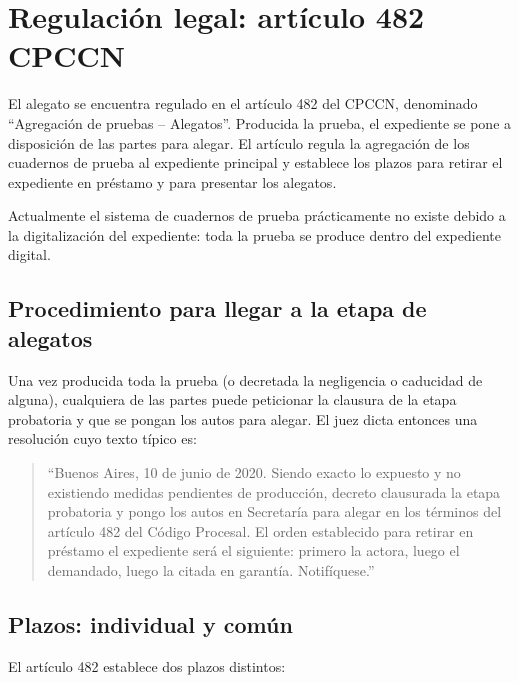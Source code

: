 \documentclass[12pt,oneside]{book}
\begin{document}
\section{Regulación legal: artículo 482 CPCCN}

El alegato se encuentra regulado en el artículo 482 del CPCCN, denominado ``Agregación de pruebas -- Alegatos''. Producida la prueba, el expediente se pone a disposición de las partes para alegar. El artículo regula la agregación de los cuadernos de prueba al expediente principal y establece los plazos para retirar el expediente en préstamo y para presentar los alegatos.

Actualmente el sistema de cuadernos de prueba prácticamente no existe debido a la digitalización del expediente: toda la prueba se produce dentro del expediente digital.

\subsection{Procedimiento para llegar a la etapa de alegatos}

Una vez producida toda la prueba (o decretada la negligencia o caducidad de alguna), cualquiera de las partes puede peticionar la clausura de la etapa probatoria y que se pongan los autos para alegar. El juez dicta entonces una resolución cuyo texto típico es:

\begin{quote}
``Buenos Aires, 10 de junio de 2020. Siendo exacto lo expuesto y no existiendo medidas pendientes de producción, decreto clausurada la etapa probatoria y pongo los autos en Secretaría para alegar en los términos del artículo 482 del Código Procesal. El orden establecido para retirar en préstamo el expediente será el siguiente: primero la actora, luego el demandado, luego la citada en garantía. Notifíquese.''
\end{quote}

\subsection{Plazos: individual y común}

El artículo 482 establece dos plazos distintos:
\end{document}
